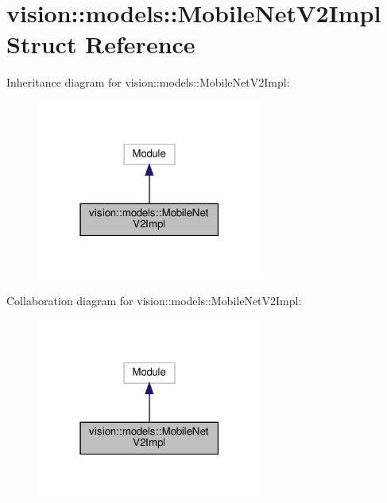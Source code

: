 \hypertarget{structvision_1_1models_1_1MobileNetV2Impl}{}\section{vision\+:\+:models\+:\+:Mobile\+Net\+V2\+Impl Struct Reference}
\label{structvision_1_1models_1_1MobileNetV2Impl}


Inheritance diagram for vision\+:\+:models\+:\+:Mobile\+Net\+V2\+Impl\+:
\nopagebreak
\begin{figure}[H]
\begin{center}
\leavevmode
\includegraphics[width=210pt]{structvision_1_1models_1_1MobileNetV2Impl__inherit__graph}
\end{center}
\end{figure}


Collaboration diagram for vision\+:\+:models\+:\+:Mobile\+Net\+V2\+Impl\+:
\nopagebreak
\begin{figure}[H]
\begin{center}
\leavevmode
\includegraphics[width=210pt]{structvision_1_1models_1_1MobileNetV2Impl__coll__graph}
\end{center}
\end{figure}
